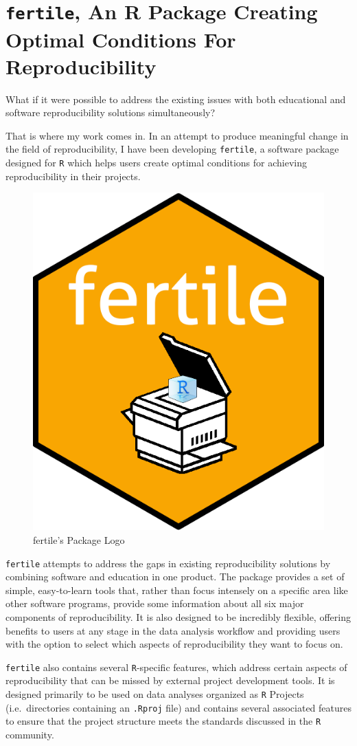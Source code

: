 \documentclass[12pt,twoside]{reedthesis}
\begin{document}
\hypertarget{fertile-an-r-package-creating-optimal-conditions-for-reproducibility}{%
\section{\texorpdfstring{\texttt{fertile}, An R Package Creating Optimal Conditions For Reproducibility}{fertile, An R Package Creating Optimal Conditions For Reproducibility}}\label{fertile-an-r-package-creating-optimal-conditions-for-reproducibility}}

What if it were possible to address the existing issues with both educational and software reproducibility solutions simultaneously?

That is where my work comes in. In an attempt to produce meaningful change in the field of reproducibility, I have been developing \texttt{fertile}, a software package designed for \texttt{R} which helps users create optimal conditions for achieving reproducibility in their projects.
\begin{figure}

{\centering \includegraphics[width=0.3\linewidth]{figure/fertile-hex} 

}

\caption{fertile's Package Logo}\label{fig:unnamed-chunk-8}
\end{figure}
\texttt{fertile} attempts to address the gaps in existing reproducibility solutions by combining software and education in one product. The package provides a set of simple, easy-to-learn tools that, rather than focus intensely on a specific area like other software programs, provide some information about all six major components of reproducibility. It is also designed to be incredibly flexible, offering benefits to users at any stage in the data analysis workflow and providing users with the option to select which aspects of reproducibility they want to focus on.

\texttt{fertile} also contains several \texttt{R}-specific features, which address certain aspects of reproducibility that can be missed by external project development tools. It is designed primarily to be used on data analyses organized as \texttt{R} Projects (i.e.~directories containing an \texttt{.Rproj} file) and contains several associated features to ensure that the project structure meets the standards discussed in the \texttt{R} community.
\end{document}
